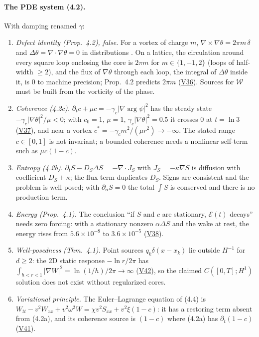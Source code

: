 \documentclass[11pt]{article}
\theoremstyle{definition}
\theoremstyle{remark}
\newcommand{\V}[1]{\hyperref[app:verify]{\textsf{#1}}}
\begin{document}
\paragraph{The PDE system (4.2).} With damping renamed $\gamma$:
\begin{enumerate}[label=(B\arabic*)]
\item \emph{Defect identity (Prop.~4.2), false.} For a vortex of charge $m$, $\nabla\times\nabla\theta=2\pi m\,\delta$ and $\Delta\theta=\nabla\cdot\nabla\theta=0$ in distributions \cite{Mermin1979}. On a lattice, the circulation around every square loop enclosing the core is $2\pi m$ for $m\in\{1,-1,2\}$ (loops of half-width $\ge2$), and the flux of $\nabla\theta$ through each loop, the integral of $\Delta\theta$ inside it, is $0$ to machine precision; Prop.~4.2 predicts $2\pi m$ (\V{V36}). Sources for $\mathcal W$ must be built from the vorticity of the phase.
\item \emph{Coherence (4.2c).} $\partial_tc+\mu c=-\gamma_c\lvert\nabla\arg\psi\rvert^2$ has the steady state $-\gamma_c\lvert\nabla\theta\rvert^2/\mu<0$; with $c_0=1$, $\mu=1$, $\gamma_c\lvert\nabla\theta\rvert^2=0.5$ it crosses $0$ at $t=\ln3$ (\V{V37}), and near a vortex $c^*=-\gamma_cm^2/(\mu r^2)\to-\infty$. The stated range $c\in[0,1]$ is not invariant; a bounded coherence needs a nonlinear self-term such as $\mu c(1-c)$.
\item \emph{Entropy (4.2b).} $\partial_tS-D_S\Delta S=-\nabla\cdot J_S$ with $J_S=-\kappa\nabla S$ is diffusion with coefficient $D_S+\kappa$; the flux term duplicates $D_S$. Signs are consistent and the problem is well posed; with $\partial_nS=0$ the total $\int S$ is conserved and there is no production term.
\item \emph{Energy (Prop.~4.1).} The conclusion ``if $S$ and $c$ are stationary, $\mathcal E(t)$ decays'' needs zero forcing: with a stationary nonzero $\alpha\Delta S$ and the wake at rest, the energy rises from $5.6\times10^{-8}$ to $3.6\times10^{-5}$ (\V{V38}).
\item \emph{Well-posedness (Thm.~4.1).} Point sources $q_k\delta(x-x_k)$ lie outside $H^{-1}$ for $d\ge2$: the 2D static response $-\ln r/2\pi$ has $\int_{h<r<1}\lvert\nabla W\rvert^2=\ln(1/h)/2\pi\to\infty$ (\V{V42}), so the claimed $C([0,T];H^1)$ solution does not exist without regularized cores.
\item \emph{Variational principle.} The Euler--Lagrange equation of (4.4) is $W_{tt}-v^2W_{xx}+v^2\omega^2W=\chi v^2S_{xx}+v^2\xi(1-c)$: it has a restoring term absent from (4.2a), and its coherence source is $(1-c)$ where (4.2a) has $\partial_t(1-c)$ (\V{V41}).

\end{enumerate}
\end{document}
